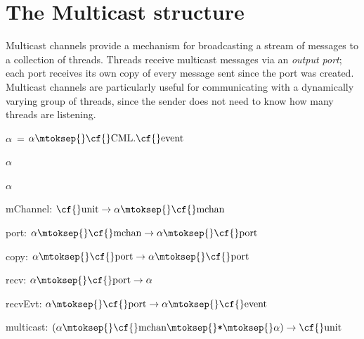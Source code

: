 \maybeclearpage
\section{The {\cf Multicast} structure}


Multicast channels provide a mechanism for broadcasting a stream of messages to a collection of threads. Threads receive multicast messages via an \emph{output port}; each port receives its own copy of every message sent since the port was created. Multicast channels are particularly useful for communicating with a dynamically varying group of threads, since the sender does not need to know how many threads are listening. 
\begin{synopsis}
\item {} \label{sig-MULTICAST}
\item {\STRUCTURE} \label{str-Multicast}
\end{synopsis}

\begin{interface}
\Nopagebreak
\item {}{} \(\alpha\)~= \(\alpha\mtoksep{}\mbox{\cf{}CML}.\mbox{\cf{}event}\)
\Nopagebreak
\item {}{} \(\alpha\)~
\Nopagebreak
\item {}{} \(\alpha\)~
\Nopagebreak
\item {}{} {\cf mChannel: \(\mbox{\cf{}unit}\rightarrow \alpha\mtoksep{}\mbox{\cf{}mchan}\)}

\Nopagebreak
\item {}{} {\cf port: \(\alpha\mtoksep{}\mbox{\cf{}mchan}\rightarrow \alpha\mtoksep{}\mbox{\cf{}port}\)}

\Nopagebreak
\item {}{} {\cf copy: \(\alpha\mtoksep{}\mbox{\cf{}port}\rightarrow \alpha\mtoksep{}\mbox{\cf{}port}\)}

\Nopagebreak
\item {}{} {\cf recv: \(\alpha\mtoksep{}\mbox{\cf{}port}\rightarrow \alpha\)}

\Nopagebreak
\item {}{} {\cf recvEvt: \(\alpha\mtoksep{}\mbox{\cf{}port}\rightarrow \alpha\mtoksep{}\mbox{\cf{}event}\)}

\Nopagebreak
\item {}{} {\cf multicast: \((\alpha\mtoksep{}\mbox{\cf{}mchan}\mtoksep{}\verb,*,\mtoksep{}\alpha)\rightarrow \mbox{\cf{}unit}\)}

\end{interface}

